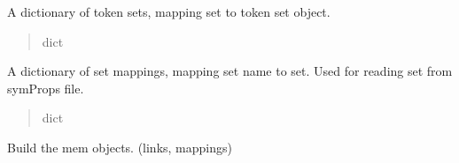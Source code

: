 \documentclass[letterpaper,10pt,english]{sphinxmanual}
\begin{document}
\begin{fulllineitems}

\begin{fulllineitems}
\label{\detokenize{nodes:nodes.nodeBuilder.nodeBuilder.token_sets}}
\pysigstartsignatures
\pysigline
{}
\pysigstopsignatures
\sphinxAtStartPar
A dictionary of token sets, mapping set to token set object.
\begin{quote}\begin{description}
\sphinxAtStartPar
dict

\end{description}\end{quote}

\end{fulllineitems}


\begin{fulllineitems}
\label{\detokenize{nodes:nodes.nodeBuilder.nodeBuilder.set_map}}
\pysigstartsignatures
\pysigline
{}
\pysigstopsignatures
\sphinxAtStartPar
A dictionary of set mappings, mapping set name to set. Used for reading set from symProps file.
\begin{quote}\begin{description}
\sphinxAtStartPar
dict

\end{description}\end{quote}

\end{fulllineitems}


\begin{fulllineitems}
\label{\detokenize{nodes:nodes.nodeBuilder.nodeBuilder.build_mem_objects}}
\pysigstartsignatures
\pysiglinewithargsret
{}
{}
{}
\pysigstopsignatures
\sphinxAtStartPar
Build the mem objects. (links, mappings)

\end{fulllineitems}



\end{fulllineitems}
\end{document}
